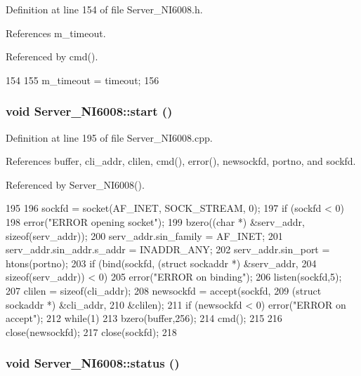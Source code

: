 Definition at line 154 of file Server\_\-NI6008.h.

References m\_\-timeout.

Referenced by cmd().


\begin{DoxyCode}
154                                         {
155     m_timeout = timeout;
156   }  
\end{DoxyCode}
\hypertarget{classServer__NI6008_ae3ac1bbf922a2475f41dfd97482af152}{
\subsubsection[{start}]{\setlength{\rightskip}{0pt plus 5cm}void Server\_\-NI6008::start ()}}
\label{classServer__NI6008_ae3ac1bbf922a2475f41dfd97482af152}


Definition at line 195 of file Server\_\-NI6008.cpp.

References buffer, cli\_\-addr, clilen, cmd(), error(), newsockfd, portno, and sockfd.

Referenced by Server\_\-NI6008().


\begin{DoxyCode}
195                          {
196   sockfd = socket(AF_INET, SOCK_STREAM, 0);
197   if (sockfd < 0) 
198     error("ERROR opening socket");
199   bzero((char *) &serv_addr, sizeof(serv_addr));
200   serv_addr.sin_family = AF_INET;
201   serv_addr.sin_addr.s_addr = INADDR_ANY;
202   serv_addr.sin_port = htons(portno);
203   if (bind(sockfd, (struct sockaddr *) &serv_addr,
204        sizeof(serv_addr)) < 0) 
205     error("ERROR on binding");
206   listen(sockfd,5);
207   clilen = sizeof(cli_addr);
208   newsockfd = accept(sockfd, 
209              (struct sockaddr *) &cli_addr, 
210              &clilen);
211   if (newsockfd < 0) error("ERROR on accept");
212      while(1) {
213        bzero(buffer,256);
214        cmd();
215      }
216   close(newsockfd);
217   close(sockfd);
218 }
\end{DoxyCode}
\hypertarget{classServer__NI6008_aae0469228b36fc7085223ad301ffe073}{
\subsubsection[{status}]{\setlength{\rightskip}{0pt plus 5cm}void Server\_\-NI6008::status ()}}
\label{classServer__NI6008_aae0469228b36fc7085223ad301ffe073}


